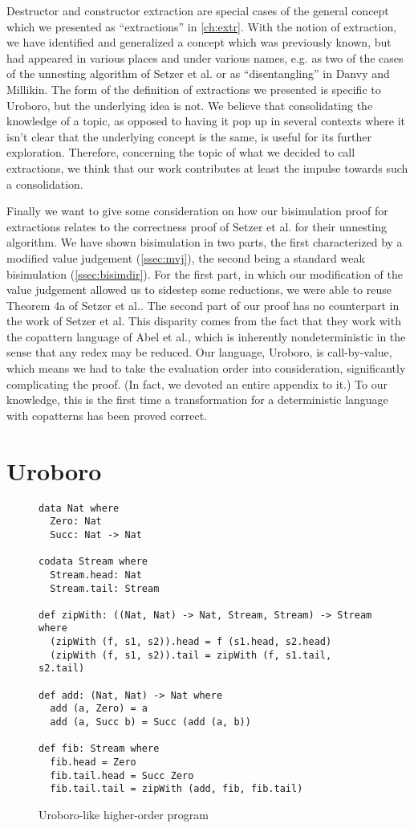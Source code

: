 Destructor and constructor extraction are special cases of the general concept which we presented as ``extractions'' in \autoref{ch:extr}. With the notion of extraction, we have identified and generalized a concept which was previously known, but had appeared in various places and under various names, e.g. as two of the cases of the unnesting algorithm of Setzer et al.\cite{setzer14unnesting} or as ``disentangling'' in Danvy and Millikin\cite{danvy09refunctionalization}. The form of the definition of extractions we presented is specific to Uroboro, but the underlying idea is not. We believe that consolidating the knowledge of a topic, as opposed to having it pop up in several contexts where it isn't clear that the underlying concept is the same, is useful for its further exploration. Therefore, concerning the topic of what we decided to call extractions, we think that our work contributes at least the impulse towards such a consolidation.

Finally we want to give some consideration on how our bisimulation proof for extractions relates to the correctness proof of Setzer et al. for their unnesting algorithm. We have shown bisimulation in two parts, the first characterized by a modified value judgement (\autoref{ssec:mvj}), the second being a standard weak bisimulation (\autoref{ssec:bisimdir}). For the first part, in which our modification of the value judgement allowed us to sidestep some reductions, we were able to reuse Theorem 4a of Setzer et al.\cite{setzer14unnesting}. The second part of our proof has no counterpart in the work of Setzer et al. This disparity comes from the fact that they work with the copattern language of Abel et al.\cite{abel13copatterns}, which is inherently nondeterministic in the sense that any redex may be reduced. Our language, Uroboro, is call-by-value, which means we had to take the evaluation order into consideration, significantly complicating the proof. (In fact, we devoted an entire appendix to it.) To our knowledge, this is the first time a transformation for a deterministic language with copatterns has been proved correct.

\section{Uroboro}
\label{sec:reluro}

\begin{figure}
\begin{lstlisting}
data Nat where
  Zero: Nat
  Succ: Nat -> Nat

codata Stream where
  Stream.head: Nat
  Stream.tail: Stream

def zipWith: ((Nat, Nat) -> Nat, Stream, Stream) -> Stream where
  (zipWith (f, s1, s2)).head = f (s1.head, s2.head)
  (zipWith (f, s1, s2)).tail = zipWith (f, s1.tail, s2.tail)

def add: (Nat, Nat) -> Nat where
  add (a, Zero) = a
  add (a, Succ b) = Succ (add (a, b))

def fib: Stream where
  fib.head = Zero
  fib.tail.head = Succ Zero
  fib.tail.tail = zipWith (add, fib, fib.tail)
\end{lstlisting}
\caption{Uroboro-like higher-order program}
\label{fig:ch5uro1}
\end{figure}

